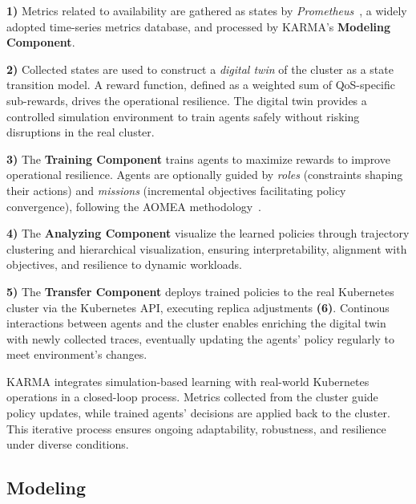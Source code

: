 \documentclass[conference]{IEEEtran}
\begin{document}
\textbf{1)} Metrics related to availability are gathered as states by \textit{Prometheus}~\cite{prometheus}, a widely adopted time-series metrics database, and processed by KARMA's \textbf{Modeling Component}.

\textbf{2)} Collected states are used to construct a \textit{digital twin} of the cluster as a state transition model. A reward function, defined as a weighted sum of QoS-specific sub-rewards, drives the operational resilience. The digital twin provides a controlled simulation environment to train agents safely without risking disruptions in the real cluster.

\textbf{3)} The \textbf{Training Component} trains agents to maximize rewards to improve operational resilience. Agents are optionally guided by \textit{roles} (constraints shaping their actions) and \textit{missions} (incremental objectives facilitating policy convergence), following the AOMEA methodology~\cite{soule2024aomea}.

\textbf{4)} The \textbf{Analyzing Component} visualize the learned policies through trajectory clustering and hierarchical visualization, ensuring interpretability, alignment with objectives, and resilience to dynamic workloads.

\textbf{5)} The \textbf{Transfer Component} deploys trained policies to the real Kubernetes cluster via the Kubernetes API, executing replica adjustments \textbf{(6)}. Continous interactions between agents and the cluster enables enriching the digital twin with newly collected traces, eventually updating the agents' policy regularly to meet environment's changes.

KARMA integrates simulation-based learning with real-world Kubernetes operations in a closed-loop process. Metrics collected from the cluster guide policy updates, while trained agents' decisions are applied back to the cluster. This iterative process ensures ongoing adaptability, robustness, and resilience under diverse conditions.


\subsection{Modeling}
\end{document}
